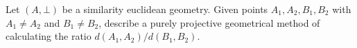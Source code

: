 Let $(A, \bot)$ be a similarity euclidean geometry. Given points $A_1, A_2, B_1, B_2$ with $A_1 \neq A_2$ and $B_1 \neq B_2$, describe a purely projective geometrical method of calculating the ratio $d(A_1, A_2)/d(B_1, B_2)$.
